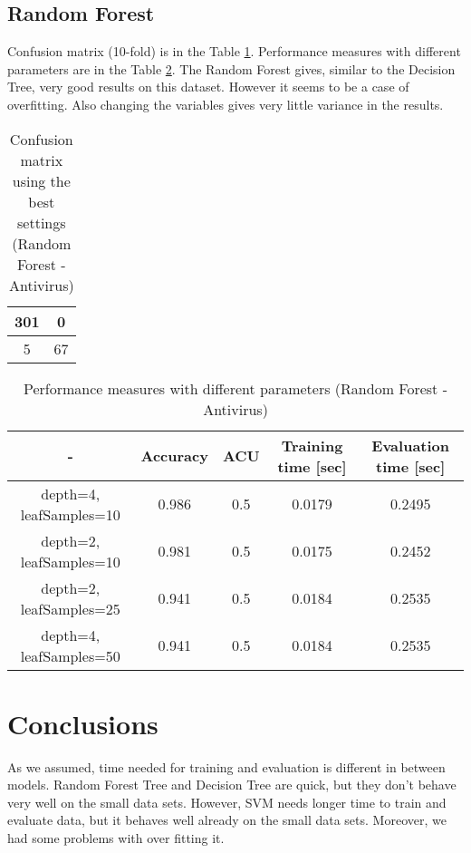 \documentclass[11pt,a4paper,titlepage]{article}
\begin{document}
\subsection{Random Forest}
Confusion matrix (10-fold) is in the Table \ref{table:confusionMatrixRFAntivirus}. Performance measures with different parameters are in the Table \ref{table:RFAntiVirus}.
The Random Forest gives, similar to the Decision Tree, very good results on this dataset. However it seems to be a case of overfitting. Also changing the variables gives very little variance in the results.
\begin{table}
  \centering
  \begin{tabular}{| c | c |}
     \hline
    301 & 0  \\ \hline
    5 & 67 \\
    \hline
  \end{tabular}
  \caption{Confusion matrix using the best settings (Random Forest - Antivirus)}
  \label{table:confusionMatrixRFAntivirus}
  \end{table}
  
  \begin{table}
  \centering
  \begin{tabular}{| c | c | c | c | c |}
    \hline
     		-	   & Accuracy & 	ACU 	& Training time [sec] & Evaluation time [sec] \\ \hline
    depth=4, leafSamples=10 &  0.986 	  &     0.5		& 		0.0179			  & 		0.2495 		\\ \hline
    depth=2, leafSamples=10 & 	0.981	  & 	0.5 		& 		0.0175			  &			 0.2452 		\\ \hline
    depth=2, leafSamples=25 & 	 0.941	  & 	0.5		& 		0.0184			  &			0.2535		\\ \hline
    depth=4, leafSamples=50 &  0.941       & 	0.5		& 		0.0184			  &			0.2535			\\
    \hline
  \end{tabular}
  \caption{Performance measures with different parameters (Random Forest - Antivirus)}
  \label{table:RFAntiVirus}
  \end{table}

\section{Conclusions}

As we assumed, time needed for training and evaluation is different in between models. Random Forest Tree and Decision Tree are quick, but they don't behave very well on the small data sets. However, SVM needs longer time to train and evaluate data, but it behaves well already on the small data sets. Moreover, we had some problems with over fitting it. 
\end{document}
